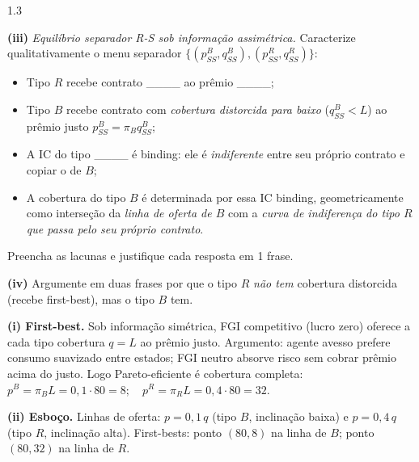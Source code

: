 \documentclass[11pt,addpoints]{exam}
\begin{document}
\begin{spacing}{1.3}
\begin{questions}
\begin{parts}
\textbf{(iii)} \emph{Equilíbrio separador R-S sob informação assimétrica.} Caracterize qualitativamente o menu separador $\{(p^B_{SS}, q^B_{SS}), (p^R_{SS}, q^R_{SS})\}$:
\begin{itemize}[noitemsep,topsep=0pt]
    \item Tipo $R$ recebe contrato \_\_\_\_ ao prêmio \_\_\_\_;
    \item Tipo $B$ recebe contrato com \emph{cobertura distorcida para baixo} ($q^B_{SS} < L$) ao prêmio justo $p^B_{SS} = \pi_B q^B_{SS}$;
    \item A IC do tipo \_\_\_\_ é binding: ele é \emph{indiferente} entre seu próprio contrato e copiar o de $B$;
    \item A cobertura do tipo $B$ é determinada por essa IC binding, geometricamente como interseção da \emph{linha de oferta de $B$} com a \emph{curva de indiferença do tipo $R$ que passa pelo seu próprio contrato}.
\end{itemize}
Preencha as lacunas e justifique cada resposta em 1 frase.

\textbf{(iv)} Argumente em duas frases por que o tipo $R$ \emph{não tem} cobertura distorcida (recebe first-best), mas o tipo $B$ tem.

\begin{solution}
\textbf{(i) First-best.} Sob informação simétrica, FGI competitivo (lucro zero) oferece a cada tipo cobertura $q = L$ ao prêmio justo. Argumento: agente avesso prefere consumo suavizado entre estados; FGI neutro absorve risco sem cobrar prêmio acima do justo. Logo Pareto-eficiente é cobertura completa: $\boxed{p^B = \pi_B L = 0{,}1 \cdot 80 = 8;\quad p^R = \pi_R L = 0{,}4 \cdot 80 = 32.}$

\textbf{(ii) Esboço.} Linhas de oferta: $p = 0{,}1\, q$ (tipo $B$, inclinação baixa) e $p = 0{,}4\, q$ (tipo $R$, inclinação alta). First-bests: ponto $(80, 8)$ na linha de $B$; ponto $(80, 32)$ na linha de $R$.


\end{solution}
\end{parts}
\end{questions}
\end{spacing}
\end{document}
